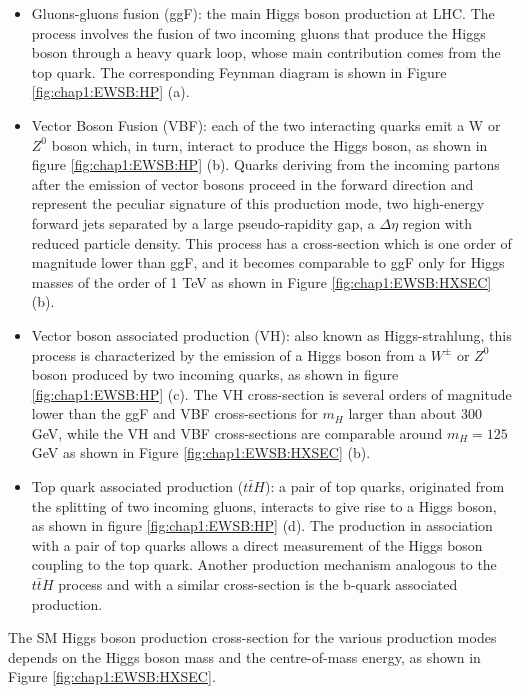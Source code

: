 \begin{itemize}
	\item Gluons-gluons fusion (ggF): the main Higgs boson production at LHC. The process involves the fusion of two incoming gluons that produce the Higgs boson through a heavy quark loop, whose main contribution comes from the top quark. The corresponding Feynman diagram is shown in Figure \ref{fig:chap1:EWSB:HP} (a).  
	\item Vector Boson Fusion (VBF): each of the two interacting quarks emit a W or $Z^0$ boson which, in turn, interact to produce the Higgs boson, as shown in figure \ref{fig:chap1:EWSB:HP} (b). Quarks deriving from the incoming partons after the emission of vector bosons proceed in the forward direction and represent the peculiar signature of this production mode, two high-energy forward jets separated by a large pseudo-rapidity gap, a $\Delta\eta$ region with reduced particle density. This process has a cross-section which is one order of magnitude lower than ggF, and it becomes comparable to ggF only for Higgs masses of the order of 1 TeV as shown in Figure \ref{fig:chap1:EWSB:HXSEC} (b).
	\item Vector boson associated production (VH): also known as Higgs-strahlung, this process is characterized by the emission of a Higgs boson from a $W^{\pm}$ or $Z^0$ boson produced by two incoming quarks, as shown in figure \ref{fig:chap1:EWSB:HP} (c). The VH cross-section is several orders of magnitude lower than the ggF and VBF cross-sections for $m_H$ larger than about 300 GeV, while the VH and VBF cross-sections are comparable around $m_H = 125$ GeV as shown in Figure \ref{fig:chap1:EWSB:HXSEC} (b).
	\item Top quark associated production ($t\bar{t}H$): a pair of top quarks, originated from the splitting of two incoming gluons, interacts to give rise to a Higgs boson, as shown in figure \ref{fig:chap1:EWSB:HP} (d). The production in association with a pair of top quarks allows a direct measurement of the Higgs boson coupling to the top quark. Another production mechanism analogous to the $t\bar{t}H$ process and with a similar cross-section is the b-quark associated production.
\end{itemize}
The SM Higgs boson production cross-section for the various production modes depends on the Higgs boson mass and the centre-of-mass energy, as shown in Figure \ref{fig:chap1:EWSB:HXSEC}. 
